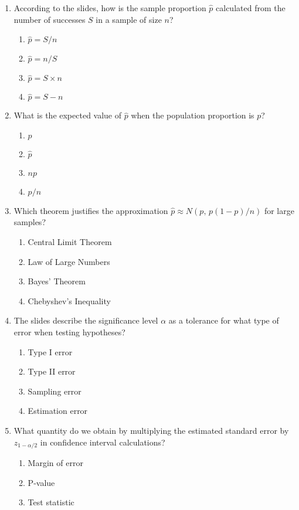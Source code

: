 \documentclass{article}
\begin{document}
\begin{enumerate}
\item According to the slides, how is the sample proportion $\hat{p}$ calculated from the number of successes $S$ in a sample of size $n$?
  \begin{enumerate}[label=(\Alph*)]
  \item $\hat{p}=S/n$
  \item $\hat{p}=n/S$
  \item $\hat{p}=S\times n$
  \item $\hat{p}=S-n$
  \end{enumerate}
\item What is the expected value of $\hat{p}$ when the population proportion is $p$?
  \begin{enumerate}[label=(\Alph*)]
  \item $p$
  \item $\hat{p}$
  \item $np$
  \item $p/n$
  \end{enumerate}
\item Which theorem justifies the approximation $\hat{p}\approx N(p,\,p(1-p)/n)$ for large samples?
  \begin{enumerate}[label=(\Alph*)]
  \item Central Limit Theorem
  \item Law of Large Numbers
  \item Bayes' Theorem
  \item Chebyshev's Inequality
  \end{enumerate}
\item The slides describe the significance level $\alpha$ as a tolerance for what type of error when testing hypotheses?
  \begin{enumerate}[label=(\Alph*)]
  \item Type I error
  \item Type II error
  \item Sampling error
  \item Estimation error
  \end{enumerate}
\item What quantity do we obtain by multiplying the estimated standard error by $z_{1-\alpha/2}$ in confidence interval calculations?
  \begin{enumerate}[label=(\Alph*)]
  \item Margin of error
  \item P-value
  \item Test statistic

\end{enumerate}
\end{enumerate}
\end{document}
